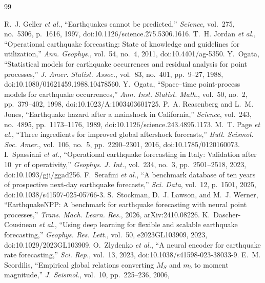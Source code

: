 \documentclass[journal]{IEEEtran}
\begin{document}
\begin{thebibliography}{99}
\itemsep 1pt

 R.~J. Geller \emph{et al.}, ``Earthquakes cannot be predicted,''
\emph{Science}, vol.~275, no.~5306, p.~1616, 1997, doi:10.1126/science.275.5306.1616.
 T.~H. Jordan \emph{et al.}, ``Operational earthquake forecasting: State
of knowledge and guidelines for utilization,'' \emph{Ann. Geophys.}, vol.~54, no.~4, 2011,
doi:10.4401/ag-5350.
 Y.~Ogata, ``Statistical models for earthquake occurrences and residual
analysis for point processes,'' \emph{J. Amer. Statist. Assoc.}, vol.~83, no.~401, pp.~9--27,
1988, doi:10.1080/01621459.1988.10478560.
 Y.~Ogata, ``Space--time point-process models for earthquake occurrences,''
\emph{Ann. Inst. Statist. Math.}, vol.~50, no.~2, pp.~379--402, 1998, doi:10.1023/A:1003403601725.
 P.~A. Reasenberg and L.~M. Jones, ``Earthquake hazard after a
mainshock in California,'' \emph{Science}, vol.~243, no.~4895, pp.~1173--1176, 1989,
doi:10.1126/science.243.4895.1173.
 M.~T. Page \emph{et al.}, ``Three ingredients for improved global aftershock
forecasts,'' \emph{Bull. Seismol. Soc. Amer.}, vol.~106, no.~5, pp.~2290--2301, 2016,
doi:10.1785/0120160073.
 I.~Spassiani \emph{et al.}, ``Operational earthquake forecasting in
Italy: Validation after 10~yr of operativity,'' \emph{Geophys. J. Int.}, vol.~234, no.~3,
pp.~2501--2518, 2023, doi:10.1093/gji/ggad256.
 F.~Serafini \emph{et al.}, ``A benchmark database of ten years of
prospective next-day earthquake forecasts,'' \emph{Sci. Data}, vol.~12, p.~1501, 2025,
doi:10.1038/s41597-025-05766-3.
 S.~Stockman, D.~J. Lawson, and M.~J. Werner, ``EarthquakeNPP:
A benchmark for earthquake forecasting with neural point processes,'' \emph{Trans.
Mach. Learn. Res.}, 2026, arXiv:2410.08226.
 K.~Dascher-Cousineau \emph{et al.}, ``Using deep learning for flexible
and scalable earthquake forecasting,'' \emph{Geophys. Res. Lett.}, vol.~50, e2023GL103909,
2023, doi:10.1029/2023GL103909.
 O.~Zlydenko \emph{et al.}, ``A neural encoder for earthquake rate
forecasting,'' \emph{Sci. Rep.}, vol.~13, 2023, doi:10.1038/s41598-023-38033-9.
 E.~M. Scordilis, ``Empirical global relations converting $M_S$ and
$m_b$ to moment magnitude,'' \emph{J. Seismol.}, vol.~10, pp.~225--236, 2006,

\end{thebibliography}
\end{document}

